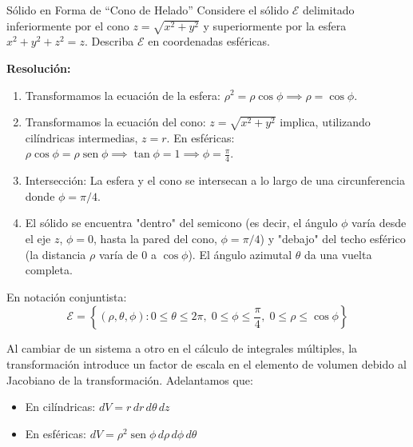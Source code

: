 \documentclass[11pt,a4paper]{article}
\begin{document}
\begin{ejemplobox}{Sólido en Forma de ``Cono de Helado''}
Considere el sólido $\mathcal{E}$ delimitado inferiormente por el cono $z = \sqrt{x^2+y^2}$ y superiormente por la esfera $x^2+y^2+z^2 = z$. Describa $\mathcal{E}$ en coordenadas esféricas.

\textbf{Resolución:}
\begin{enumerate}
    \item Transformamos la ecuación de la esfera: $\rho^2 = \rho \cos \phi \implies \rho = \cos \phi$.
    \item Transformamos la ecuación del cono: $z = \sqrt{x^2+y^2}$ implica, utilizando cilíndricas intermedias, $z = r$. En esféricas: $\rho \cos \phi = \rho \operatorname{sen} \phi \implies \tan \phi = 1 \implies \phi = \frac{\pi}{4}$.
    \item Intersección: La esfera y el cono se intersecan a lo largo de una circunferencia donde $\phi = \pi/4$.
    \item El sólido se encuentra "dentro" del semicono (es decir, el ángulo $\phi$ varía desde el eje $z$, $\phi=0$, hasta la pared del cono, $\phi=\pi/4$) y "debajo" del techo esférico (la distancia $\rho$ varía de $0$ a $\cos \phi$). El ángulo azimutal $\theta$ da una vuelta completa.
\end{enumerate}
En notación conjuntista:
\[ \mathcal{E} = \left\{ (\rho, \theta, \phi) : 0 \leq \theta \leq 2\pi, \; 0 \leq \phi \leq \frac{\pi}{4}, \; 0 \leq \rho \leq \cos \phi \right\} \]
\begin{center}
\end{center}
\end{ejemplobox}

\begin{observacionbox}
Al cambiar de un sistema a otro en el cálculo de integrales múltiples, la transformación introduce un factor de escala en el elemento de volumen debido al Jacobiano de la transformación. Adelantamos que:
\begin{itemize}
    \item En cilíndricas: $dV = r \, dr \, d\theta \, dz$
    \item En esféricas: $dV = \rho^2 \operatorname{sen} \phi \, d\rho \, d\phi \, d\theta$
\end{itemize}
\end{observacionbox}
\end{document}
